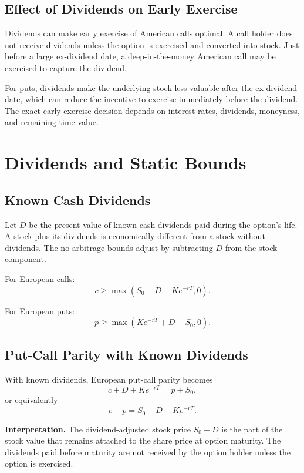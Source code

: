 \subsection{Effect of Dividends on Early Exercise}

Dividends can make early exercise of American calls optimal. A call holder does
not receive dividends unless the option is exercised and converted into stock.
Just before a large ex-dividend date, a deep-in-the-money American call may be
exercised to capture the dividend.

For puts, dividends make the underlying stock less valuable after the
ex-dividend date, which can reduce the incentive to exercise immediately before
the dividend. The exact early-exercise decision depends on interest rates,
dividends, moneyness, and remaining time value.

\section{Dividends and Static Bounds}

\subsection{Known Cash Dividends}

Let $D$ be the present value of known cash dividends paid during the option's
life. A stock plus its dividends is economically different from a stock without
dividends. The no-arbitrage bounds adjust by subtracting $D$ from the stock
component.

For European calls:
\[
    c \geq \max(S_0-D-K e^{-rT},0).
\]

For European puts:
\[
    p \geq \max(K e^{-rT}+D-S_0,0).
\]

\subsection{Put-Call Parity with Known Dividends}

With known dividends, European put-call parity becomes
\[
    c + D + K e^{-rT} = p + S_0,
\]
or equivalently
\[
    c-p = S_0-D-K e^{-rT}.
\]

\begin{boxF}
\textbf{Interpretation.} The dividend-adjusted stock price $S_0-D$ is the part
of the stock value that remains attached to the share price at option maturity.
The dividends paid before maturity are not received by the option holder unless
the option is exercised.
\end{boxF}

